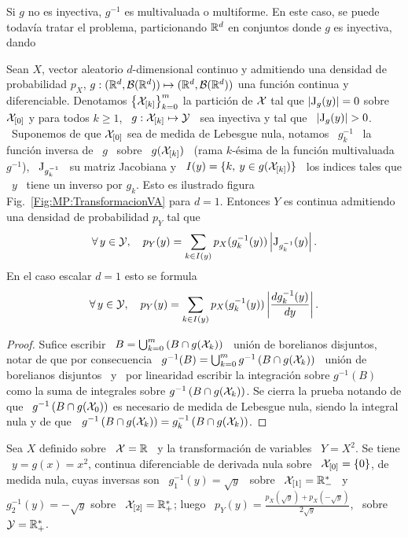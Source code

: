 Si $g$ no es inyectiva, $g^{-1}$  es multivaluada o multiforme. En este caso, se
puede todav\'ia  tratar el problema, particionando $\mathbb{R}^d$  en conjuntos donde
$g$ es inyectiva, dando
%
\begin{teorema}
\label{Teo:MP:TransformacionNoInyectivaDensidad}
%
  Sean $X$, vector aleatorio  $d$-dimensional continuo y admitiendo una densidad
  de  probabilidad   $p_X$,  $g:(\mathbb{R}^d  ,  \mathcal{B}(\mathbb{R}^d))   \mapsto  (\mathbb{R}^d  ,
  \mathcal{B}(\mathbb{R}^d))$  una  funci\'on continua  y  diferenciable.  Denotamos  $\left\{
    \mathcal{X}_{[k]} \right\}_{k=0}^m$ la partici\'on  de $\mathcal{X}$ tal que $\left| \operatorname{J}_g(y)
  \right| = 0$ sobre  $\mathcal{X}_{[0]}$ y para todos $k \ge 1$,  \ $g: \mathcal{X}_{[k]} \mapsto
  \mathcal{Y}$ \ sea inyectiva y tal que \ $\left| \operatorname{J}_g(y) \right| > 0$. \ Suponemos de
  que  $\mathcal{X}_{[0]}$ sea  de medida  de Lebesgue  nula, notamos  \ $g_k^{-1}$  \ la
  funci\'on inversa de  \ $g$ \ sobre \ $g(\mathcal{X}_{[k]})$ \  (rama $k$-\'esima de la
  funci\'on multivaluada $g^{-1}$), \  $\operatorname{J}_{g_k^{-1}}$ \ su matriz Jacobiana y
  \ $I(y) = \{ k, \: y \in g(\mathcal{X}_{[k]}) \}$ \ los indices tales que \ $y$ \ tiene
  un      inverso     por      $g_k$.      Esto      es      ilustrado     figura
  Fig.~\ref{Fig:MP:TransformacionVA}  para $d  = 1$.   Entonces $Y$  es continua
  admitiendo una densidad de probabilidad $p_Y$ tal que
  \[
  \forall  \, y  \in \mathcal{Y},  \quad p_Y(y)  = \sum_{k  \in  I(y)} p_X(g_k^{-1}(y))
  \left| \operatorname{J}_{g_k^{-1}}(y) \right|.
  \]
  En el caso escalar $d = 1$ esto se formula
  \[
  \forall \, y \in \mathcal{Y}, \quad  p_Y(y) = \sum_{k \in I(y)} p_X(g_k^{-1}(y)) \left|
    \frac{d g_k^{-1}(y)}{dy} \right|.
  \]
\end{teorema}
%
\begin{proof}
  Sufice escribir  \ $B  = \bigcup_{k =  0}^m \left(  B \cap g(\mathcal{X}_k)  \right)$ \
  uni\'on de borelianos disjuntos, notar  de que por consecuencia \ $g^{-1}(B) =
  \bigcup_{k =0}^m g^{-1}\left( B \cap  g(\mathcal{X}_k) \right)$ \ uni\'on de borelianos
  disjuntos \  y \  por linearidad escribir  la integraci\'on  sobre $g^{-1}(B)$
  como la  suma de  integrales sobre $g^{-1}\left(  B \cap g(\mathcal{X}_k)  \right)$. Se
  cierra la  prueba notando de  que \ $g^{-1}\left(  B \cap g(\mathcal{X}_0)  \right)$ es
  necesario  de medida de  Lebesgue nula,  siendo la  integral nula  y de  que \
  $g^{-1}\left( B \cap g(\mathcal{X}_k) \right) = g_k^{-1}\left( B \cap g(\mathcal{X}_k) \right)$.
\end{proof}
%

\begin{ejemplo}
\label{Ej:MP:TransformacionNoBiyectiva}
%
  Sea $X$ definido sobre  \ $\mathcal{X} = \mathbb{R}$ \ y la  transformaci\'on de variables \
  $Y = X^2$.   Se tiene \ $y  = g(x) = x^2$, continua  diferenciable de derivada
  nula  sobre \  $\mathcal{X}_{[0]} =  \{ 0  \}$, de  medida nula,  cuyas inversas  son \
  $g_1^{-1}(y) = \sqrt{y}$ \ sobre \ $\mathcal{X}_{[1]} = \mathbb{R}_-^*$ \ y \ $g_2^{-1}(y) =
  -   \sqrt{y}$  sobre   \   $\mathcal{X}_{[2]}   =  \mathbb{R}_+^*$;   luego   \  $p_Y(y)   =
  \frac{p_X(\sqrt{y})  +   p_X(-\sqrt{y})}{2  \sqrt{y}}$,   \  sobre  \   $\mathcal{Y}  =
  \mathbb{R}_+^*$.
\end{ejemplo}

